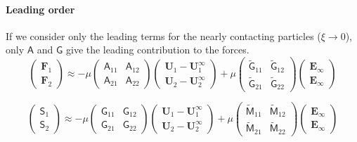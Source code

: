 \documentclass[12pt]{article}
\newcommand{\tens}[1]{\bm{\mathsf{#1}}}
\begin{document}
\paragraph{Leading order}
If we consider only the leading terms for 
the nearly contacting particles ($\xi \to 0$),
only $\tens{A}$ and $\tens{G}$ give the leading contribution to the forces.
\begin{equation}
 \begin{pmatrix}
  \bm{F}_{1} \\
  \bm{F}_{2} 
 \end{pmatrix}
\approx
- \mu
\begin{pmatrix}
\tens{A}_{11} &
\tens{A}_{12}  \\
\tens{A}_{21}  &
\tens{A}_{22}  
\end{pmatrix}
 \begin{pmatrix}
  \bm{U}_{1} -  \bm{U}_{1}^{\infty}\\
  \bm{U}_{2} -  \bm{U}_{2}^{\infty}
 \end{pmatrix}
 + \mu
\begin{pmatrix}
\tilde{\tens{G}}_{11} &
\tilde{\tens{G}}_{12}  \\
\tilde{\tens{G}}_{21}  &
\tilde{\tens{G}}_{22}  
\end{pmatrix}
 \begin{pmatrix}
\bm{E}_{\infty} \\ \bm{E}_{\infty}
\end{pmatrix}
\end{equation}

\begin{equation}
 \begin{pmatrix}
  \tens{S}_{1} \\
  \tens{S}_{2} 
 \end{pmatrix}
\approx
- \mu
\begin{pmatrix}
\tens{G}_{11} &
\tens{G}_{12}  \\
\tens{G}_{21}  &
\tens{G}_{22}  
\end{pmatrix}
 \begin{pmatrix}
  \bm{U}_{1} -  \bm{U}_{1}^{\infty}\\
  \bm{U}_{2} -  \bm{U}_{2}^{\infty}
 \end{pmatrix}
 + \mu
\begin{pmatrix}
\tilde{\tens{M}}_{11} &
\tilde{\tens{M}}_{12}  \\
\tilde{\tens{M}}_{21}  &
\tilde{\tens{M}}_{22}  
\end{pmatrix}
 \begin{pmatrix}
\bm{E}_{\infty} \\ \bm{E}_{\infty}
\end{pmatrix}
\end{equation}
\end{document}
